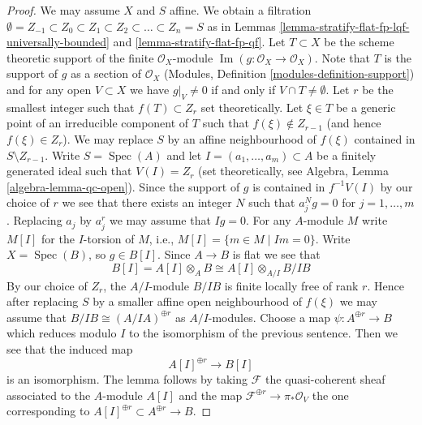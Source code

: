 \documentclass[10pt,a4paper]{amsart}
\theoremstyle{plain}
\theoremstyle{definition}
\theoremstyle{remark}
\numberwithin{equation}{subsection}
\def\Spec{\mathop{\mathrm{Spec}}}
\def\Im{\mathop{\mathrm{Im}}}
\begin{document}
\begin{proof}
We may assume $X$ and $S$ affine. We obtain a filtration
$\emptyset = Z_{-1} \subset Z_0 \subset Z_1 \subset Z_2 \subset \ldots
\subset Z_n = S$ as in
Lemmas \ref{lemma-stratify-flat-fp-lqf-universally-bounded} and
\ref{lemma-stratify-flat-fp-qf}.
Let $T \subset X$ be the scheme theoretic support of the finite
$\mathcal{O}_X$-module $\Im(g : \mathcal{O}_X \to \mathcal{O}_X)$.
Note that $T$ is the support of $g$ as a section of $\mathcal{O}_X$
(Modules, Definition \ref{modules-definition-support}) and
for any open $V \subset X$ we have $g|_V \not = 0$ if and only if
$V \cap T \not = \emptyset$.
Let $r$ be the smallest integer such that $f(T) \subset Z_r$
set theoretically. Let $\xi \in T$ be a generic point of an irreducible
component of $T$ such that $f(\xi) \not \in Z_{r - 1}$ (and hence
$f(\xi) \in Z_r$). We may replace $S$ by an affine neighbourhood of
$f(\xi)$ contained in $S \setminus Z_{r - 1}$. Write $S = \Spec(A)$
and let $I = (a_1, \ldots, a_m) \subset A$ be a finitely generated ideal
such that $V(I) = Z_r$ (set theoretically, see
Algebra, Lemma \ref{algebra-lemma-qc-open}).
Since the support of $g$ is contained in $f^{-1}V(I)$ by our choice of $r$
we see that there exists an integer $N$ such that
$a_j^N g = 0$ for $j = 1, \ldots, m$. Replacing $a_j$ by $a_j^r$
we may assume that $Ig = 0$. For any $A$-module $M$ write
$M[I]$ for the $I$-torsion of $M$, i.e., $M[I] = \{m \in M \mid Im = 0\}$.
Write $X = \Spec(B)$, so $g \in B[I]$. Since $A \to B$ is flat we
see that
$$
B[I] = A[I] \otimes_A B \cong A[I] \otimes_{A/I} B/IB
$$
By our choice of $Z_r$, the $A/I$-module $B/IB$ is
finite locally free of rank $r$. Hence after replacing $S$ by
a smaller affine open neighbourhood of $f(\xi)$ we may assume
that $B/IB \cong (A/IA)^{\oplus r}$ as $A/I$-modules.
Choose a map $\psi : A^{\oplus r} \to B$ which reduces modulo $I$ to the
isomorphism of the previous sentence. Then we see that
the induced map
$$
A[I]^{\oplus r} \longrightarrow B[I]
$$
is an isomorphism. The lemma follows by taking $\mathcal{F}$ the
quasi-coherent sheaf associated to the $A$-module $A[I]$ and
the map $\mathcal{F}^{\oplus r} \to \pi_*\mathcal{O}_V$ the
one corresponding to $A[I]^{\oplus r} \subset A^{\oplus r} \to B$.
\end{proof}
\end{document}
